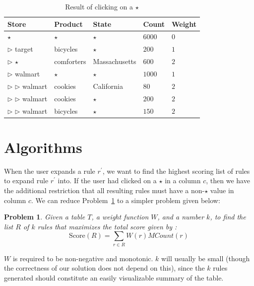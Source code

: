 \documentclass{sig-alternate}
\newcounter{prob}
\newtheorem{problem}[prob]{Problem}
\begin{document}
\begin{table}
\centering
\begin{tabular}{| l | l | l | l | l |}
\hline Store & Product & State & Count & Weight \\
\hline
$\star$ & $\star$ & $\star$ & $6000$ & $0$ \\ \cline{1-5}
$\triangleright$ target & bicycles & $\star$ & $200$ & $1$ \\ \cline{1-5}
$\triangleright$ $\star$ & comforters & Massachusetts & $600$ & $2$ \\ \cline{1-5}
$\triangleright$ walmart & $\star$ & $\star$ & $1000$ & $1$ \\ \cline{2-5}
$\triangleright$ $\triangleright$ walmart & cookies & California & $80$ & $2$ \\ \cline{2-5}
$\triangleright$ $\triangleright$ walmart & cookies & $\star$ & $200$ & $2$ \\ \cline{2-5}
$\triangleright$ $\triangleright$ walmart & bicycles & $\star$ & $150$ & $2$ \\  \hline
\end{tabular}
\caption{Result of clicking on a $\star$ \label{table:introexample3}}
\end{table}

\section{Algorithms}
\label{sec:algorithms}
When the user expands a rule $r^{\prime}$, we want to find the highest scoring list of rules to expand rule $r^{\prime}$ into. If the user had clicked on a $\star$ in a column $c$, then we have the additional restriction that all resulting rules must have a non-$\star$ value in column $c$. We can reduce Problem~\ref{prob:optimal-rule-list} to a simpler problem given below: 

\begin{problem}\label{prob:optimal-rule-list}
Given a table $T$, a weight function $W$, and a number $k$, to find the list $R$ of $k$ rules that maximizes the total score given by :
$$\text{Score}(R) = \sum_{r \in R}W(r)MCount(r)$$
\end{problem}

$W$ is required to be non-negative and monotonic. $k$ will usually be small (though the correctness of our solution does not depend on this), since the $k$ rules generated should constitute an easily visualizable summary of the table. 
\end{document}
